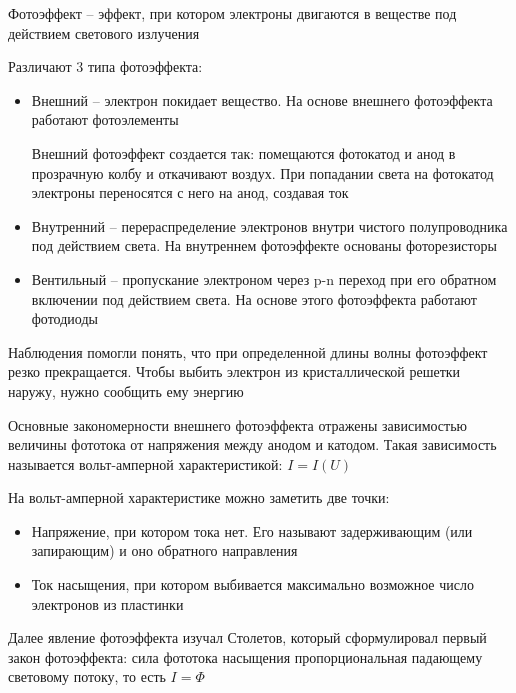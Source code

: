 \documentclass[12pt]{article}
\begin{document}
\bigvspace

Фотоэффект -- эффект, при котором электроны двигаются в веществе под действием светового излучения

Различают 3 типа фотоэффекта:

\begin{itemize}
    \item Внешний -- электрон покидает вещество. На основе внешнего фотоэффекта работают фотоэлементы
    
    Внешний фотоэффект создается так: помещаются фотокатод и анод в прозрачную колбу и откачивают воздух. При попадании света на фотокатод электроны переносятся с него на анод, создавая ток 

    \item Внутренний -- перераспределение электронов внутри чистого полупроводника под действием света. На внутреннем фотоэффекте основаны фоторезисторы

    \item Вентильный -- пропускание электроном через p-n переход при его обратном включении под действием света. На основе этого фотоэффекта работают фотодиоды
\end{itemize}


Наблюдения помогли понять, что при определенной длины волны фотоэффект резко прекращается. Чтобы выбить электрон из кристаллической решетки наружу, нужно сообщить ему энергию

Основные закономерности внешнего фотоэффекта отражены зависимостью величины фототока от напряжения между анодом и катодом. Такая зависимость называется вольт-амперной характеристикой: $I = I(U)$


На вольт-амперной характеристике можно заметить две точки:

\begin{itemize}
    \item Напряжение, при котором тока нет. Его называют задерживающим (или запирающим) и оно обратного направления
    \item Ток насыщения, при котором выбивается максимально возможное число электронов из пластинки
\end{itemize}

\mediumvspace

Далее явление фотоэффекта изучал Столетов, который сформулировал первый закон фотоэффекта: сила фототока насыщения пропорциональная падающему световому потоку, то есть $I = \Phi$
\end{document}
